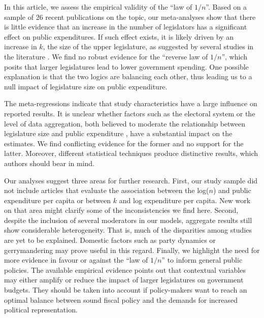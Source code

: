 \documentclass[a4paper,12pt]{article}
\begin{document}
In this article, we assess the empirical validity of the ``law of $1/n$''. Based
on a sample of 26 recent publications on the topic, our meta-analyses show that
there is little evidence that an increase in the number of legislators has a
significant effect on public expenditures. If such effect exists, it is likely
driven by an increase in $k$, the size of the upper legislature, as suggested by
several studies in the literature \citep[e.g.,][]{baqir2002districting, 
bradbury2001legislative, bradbury2003local, chen_malhotra_2007,
gilligan2001fiscal, primo2006stop}. We find no robust evidence for the ``reverse
law of $1/n$'', which posits that larger legislatures lead to lower government
spending. One possible explanation is that the two logics are balancing each
other, thus leading us to a null impact of legislature size on public
expenditure.

The meta-regressions indicate that study characteristics have a large influence
on reported results. It is unclear whether factors such as the electoral system
or the level of data aggregation, both believed to moderate the relationship
between legislature size and public expenditure \citep{primo2008distributive,
baqir2002districting, bradbury2003local}, have a substantial impact on the
estimates. We find conflicting evidence for the former and no support for the
latter. Moreover, different statistical techniques produce distinctive results,
which authors should bear in mind.

Our analyses suggest three areas for further research. First, our study sample
did not include articles that evaluate the association between the log($n$) and
public expenditure per capita or between $k$ and log expenditure per capita.
New work on that area might clarify some of the inconsistencies we find
here. Second, despite the inclusion of several moderators in our models,
aggregate results still show considerable heterogeneity. That is, much of the
disparities among studies are yet to be explained. Domestic factors such as
party dynamics or gerrymandering \citep{lee2015supermajority,
mukherjee2003politicalparties, gilligan2006public} may prove useful in this
regard. Finally, we highlight the need for more evidence in favour or against
the ``law of $1/n$'' to inform general public policies. The available empirical
evidence points out that contextual variables may either amplify or reduce the
impact of larger legislatures on government budgets. They should be taken into
account if policy-makers want to reach an optimal balance between sound fiscal
policy and the demands for increased political representation.

\newpage



\nocite{baskaran2013coalition, bradbury2009spatially, drew2017price,
erler2007termlimits, fiorino2007legislature, hohmann2017effect,
kessler2014communication, lewis2019legislature, lledo2003electoral,
mukherjee2003politicalparties, petterssonlidbom2012size, schaltegger2009large,
stein1998institutional, mukherjee2003politicalparties, macdonald2008impact,
matsusaka2005endogeneity, ricciuti2004legislatures}
\end{document}
